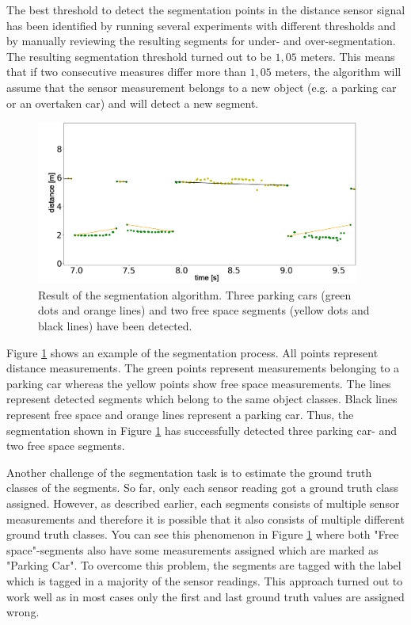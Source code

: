 The best threshold to detect the segmentation points in the distance sensor signal has been identified by running several experiments with different thresholds and by manually reviewing the resulting segments for under- and over-segmentation. The resulting segmentation threshold turned out to be $1,05$ meters. This means that if two consecutive measures differ more than $1,05$ meters, the algorithm will assume that the sensor measurement belongs to a new object (e.g. a parking car or an overtaken car) and will detect a new segment.

\begin{figure}
	\centering
	\includegraphics[width=0.95\textwidth]{img/segmentation_example.PNG}
	\caption{Result of the segmentation algorithm. Three parking cars (green dots and orange lines) and two free space segments (yellow dots and black lines) have been detected.}
	\label{fig:segmentation}
\end{figure}

Figure \ref{fig:segmentation} shows an example of the segmentation process. All points represent distance measurements. The green points represent measurements belonging to a parking car whereas the yellow points show free space measurements. The lines represent detected segments which belong to the same object classes. Black lines represent free space and orange lines represent a parking car. Thus, the segmentation shown in Figure \ref{fig:segmentation} has successfully detected three parking car- and two free space segments. 

Another challenge of the segmentation task is to estimate the ground truth classes of the segments. So far, only each sensor reading got a ground truth class assigned. However, as described earlier, each segments consists of multiple sensor measurements and therefore it is possible that it also consists of multiple different ground truth classes. You can see this phenomenon in Figure \ref{fig:segmentation} where both "Free space"-segments also have some measurements assigned which are marked as "Parking Car". To overcome this problem, the segments are tagged with the label which is tagged in a majority of the sensor readings. This approach turned out to work well as in most cases only the first and last ground truth values are assigned wrong. 




